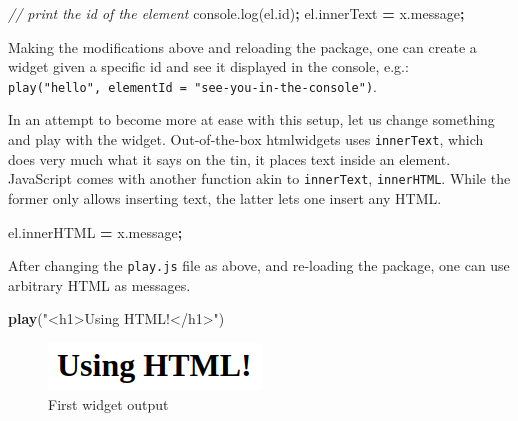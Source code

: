 \documentclass[
]{krantz}
\makeatletter
\newenvironment{Shaded}{\begin{snugshade}}{\end{snugshade}}
\newcommand{\AttributeTok}[1]{\textcolor[rgb]{0.61,0.61,0.61}{#1}}
\newcommand{\CommentTok}[1]{\textcolor[rgb]{0.37,0.37,0.37}{\textit{#1}}}
\newcommand{\KeywordTok}[1]{\textcolor[rgb]{0.27,0.27,0.27}{\textbf{#1}}}
\newcommand{\NormalTok}[1]{#1}
\newcommand{\OperatorTok}[1]{\textcolor[rgb]{0.43,0.43,0.43}{\textbf{#1}}}
\newcommand{\StringTok}[1]{\textcolor[rgb]{0.5,0.5,0.5}{#1}}
\newcommand{\VariableTok}[1]{\textcolor[rgb]{0,0,0}{#1}}
\newenvironment{kframe}{%
\medskip{}
\setlength{\fboxsep}{.8em}
 \def\at@end@of@kframe{}%
 \ifinner\ifhmode%
  \def\at@end@of@kframe{\end{minipage}}%
  \begin{minipage}{\columnwidth}%
 \fi\fi%
 \def\FrameCommand##1{\hskip\@totalleftmargin \hskip-\fboxsep
 \colorbox{shadecolor}{##1}\hskip-\fboxsep
     \hskip-\linewidth \hskip-\@totalleftmargin \hskip\columnwidth}%
 \MakeFramed {\advance\hsize-\width
   \@totalleftmargin\z@ \linewidth\hsize
   \@setminipage}}%
 {\par\unskip\endMakeFramed%
 \at@end@of@kframe}
\renewenvironment{Shaded}{\begin{kframe}}{\end{kframe}}
\makeatother
\begin{document}
\begin{Shaded}
\begin{Highlighting}[]
\CommentTok{// print the id of the element}
\VariableTok{console}\NormalTok{.}\AttributeTok{log}\NormalTok{(}\VariableTok{el}\NormalTok{.}\AttributeTok{id}\NormalTok{)}\OperatorTok{;}
\VariableTok{el}\NormalTok{.}\AttributeTok{innerText} \OperatorTok{=} \VariableTok{x}\NormalTok{.}\AttributeTok{message}\OperatorTok{;}
\end{Highlighting}
\end{Shaded}

Making the modifications above and reloading the package, one can create a widget given a specific id and see it displayed in the console, e.g.: \texttt{play("hello",\ elementId\ =\ "see-you-in-the-console")}.

In an attempt to become more at ease with this setup, let us change something and play with the widget. Out-of-the-box htmlwidgets uses \texttt{innerText}, which does very much what it says on the tin, it places text inside an element. JavaScript comes with another function akin to \texttt{innerText}, \texttt{innerHTML}. While the former only allows inserting text, the latter lets one insert any HTML.

\begin{Shaded}
\begin{Highlighting}[]
\VariableTok{el}\NormalTok{.}\AttributeTok{innerHTML} \OperatorTok{=} \VariableTok{x}\NormalTok{.}\AttributeTok{message}\OperatorTok{;}
\end{Highlighting}
\end{Shaded}

After changing the \texttt{play.js} file as above, and re-loading the package, one can use arbitrary HTML as messages.

\begin{Shaded}
\begin{Highlighting}[]
\KeywordTok{play}\NormalTok{(}\StringTok{"<h1>Using HTML!</h1>"}\NormalTok{)}
\end{Highlighting}
\end{Shaded}

\begin{figure}[t]

{\centering \includegraphics[width=1\linewidth]{images/playground-h1} 

}

\caption{First widget output}\label{fig:playground-h1}
\end{figure}
\end{document}

